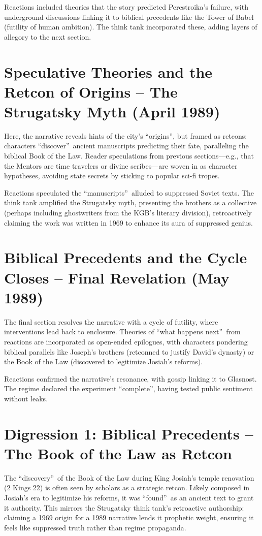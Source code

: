 \documentclass[openany]{book}
\begin{document}
Reactions included theories that the story predicted Perestroika's failure, with underground discussions linking it to biblical precedents like the Tower of Babel (futility of human ambition). The think tank incorporated these, adding layers of allegory to the next section.

\section{Speculative Theories and the Retcon of Origins – The Strugatsky Myth (April 1989)}
Here, the narrative reveals hints of the city's \textquotedblleft origins\textquotedblright, but framed as retcons: characters \textquotedblleft discover\textquotedblright\ ancient manuscripts predicting their fate, paralleling the biblical Book of the Law. Reader speculations from previous sections---e.g., that the Mentors are time travelers or divine scribes---are woven in as character hypotheses, avoiding state secrets by sticking to popular sci-fi tropes.

Reactions speculated the \textquotedblleft manuscripts\textquotedblright\ alluded to suppressed Soviet texts. The think tank amplified the Strugatsky myth, presenting the brothers as a collective (perhaps including ghostwriters from the KGB's literary division), retroactively claiming the work was written in 1969 to enhance its aura of suppressed genius.

\section{Biblical Precedents and the Cycle Closes – Final Revelation (May 1989)}
The final section resolves the narrative with a cycle of futility, where interventions lead back to enclosure. Theories of \textquotedblleft what happens next\textquotedblright\ from reactions are incorporated as open-ended epilogues, with characters pondering biblical parallels like Joseph's brothers (retconned to justify David's dynasty) or the Book of the Law (discovered to legitimize Josiah's reforms).

Reactions confirmed the narrative's resonance, with gossip linking it to Glasnost. The regime declared the experiment \textquotedblleft complete\textquotedblright, having tested public sentiment without leaks.

\section{Digression 1: Biblical Precedents – The Book of the Law as Retcon}
The \textquotedblleft discovery\textquotedblright\ of the Book of the Law during King Josiah's temple renovation (2 Kings 22) is often seen by scholars as a strategic retcon. Likely composed in Josiah's era to legitimize his reforms, it was \textquotedblleft found\textquotedblright\ as an ancient text to grant it authority. This mirrors the Strugatsky think tank's retroactive authorship: claiming a 1969 origin for a 1989 narrative lends it prophetic weight, ensuring it feels like suppressed truth rather than regime propaganda.
\end{document}

